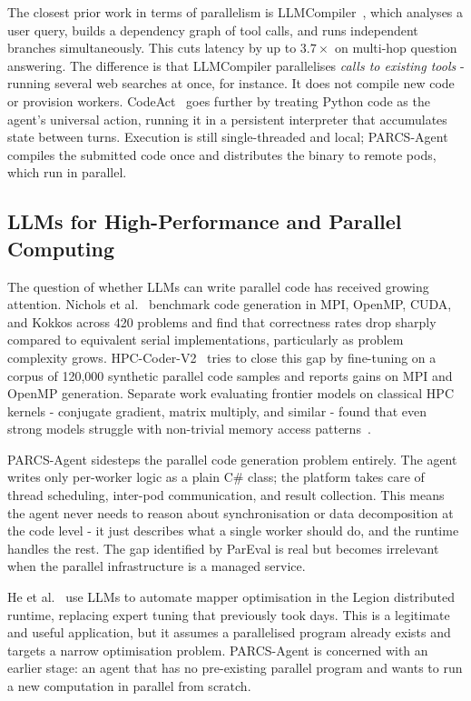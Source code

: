 \documentclass[preprints,article,submit,pdftex,moreauthors]{Definitions/mdpi}
\begin{document}
The closest prior work in terms of parallelism is LLMCompiler~\citep{ref-llmcompiler}, which analyses a user query, builds a dependency graph of tool calls, and runs independent branches simultaneously. This cuts latency by up to $3.7\times$ on multi-hop question answering. The difference is that LLMCompiler parallelises \emph{calls to existing tools} - running several web searches at once, for instance. It does not compile new code or provision workers. CodeAct~\citep{ref-codeact} goes further by treating Python code as the agent's universal action, running it in a persistent interpreter that accumulates state between turns. Execution is still single-threaded and local; PARCS-Agent compiles the submitted code once and distributes the binary to remote pods, which run in parallel.

\subsection{LLMs for High-Performance and Parallel Computing}

The question of whether LLMs can write parallel code has received growing attention. Nichols et al.~\citep{ref-pareval} benchmark code generation in MPI, OpenMP, CUDA, and Kokkos across 420 problems and find that correctness rates drop sharply compared to equivalent serial implementations, particularly as problem complexity grows. HPC-Coder-V2~\citep{ref-hpccoder} tries to close this gap by fine-tuning on a corpus of 120{,}000 synthetic parallel code samples and reports gains on MPI and OpenMP generation. Separate work evaluating frontier models on classical HPC kernels - conjugate gradient, matrix multiply, and similar - found that even strong models struggle with non-trivial memory access patterns~\citep{ref-deepseekhpc}.

PARCS-Agent sidesteps the parallel code generation problem entirely. The agent writes only per-worker logic as a plain C\# class; the platform takes care of thread scheduling, inter-pod communication, and result collection. This means the agent never needs to reason about synchronisation or data decomposition at the code level - it just describes what a single worker should do, and the runtime handles the rest. The gap identified by ParEval is real but becomes irrelevant when the parallel infrastructure is a managed service.

He et al.~\citep{ref-legionllm} use LLMs to automate mapper optimisation in the Legion distributed runtime, replacing expert tuning that previously took days. This is a legitimate and useful application, but it assumes a parallelised program already exists and targets a narrow optimisation problem. PARCS-Agent is concerned with an earlier stage: an agent that has no pre-existing parallel program and wants to run a new computation in parallel from scratch.
\end{document}
